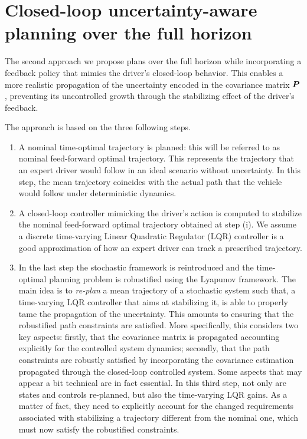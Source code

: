 \section{Closed-loop uncertainty-aware planning over the full horizon}
\label{sec:closed_loop_planning}

The second approach we propose plans over the full horizon while incorporating a feedback policy that mimics the driver's closed-loop behavior. This enables a more realistic propagation of the uncertainty encoded in the covariance matrix $\boldsymbol{P}$, preventing its uncontrolled growth through the stabilizing effect of the driver's feedback.

The approach is based on the three following steps. 
\begin{enumerate}[label=\roman*)]
\item A nominal time-optimal trajectory is planned: this will be referred to as nominal feed-forward optimal trajectory. This represents the trajectory that an expert driver would follow in an ideal scenario without uncertainty. In this step, the mean trajectory coincides with the actual path that the vehicle would follow under deterministic dynamics.

\item A closed-loop controller mimicking the driver's action is computed to stabilize the nominal feed-forward optimal trajectory obtained at step (i). We assume a discrete time-varying Linear Quadratic Regulator (LQR) controller is a good approximation of how an expert driver can track a prescribed trajectory.

\item In the last step the stochastic framework is reintroduced and the time-optimal planning problem is robustified using the Lyapunov framework. The main idea is to \emph{re-plan} a mean trajectory of a stochastic system such that, a time-varying LQR controller that aims at stabilizing it, is able to properly tame the propagation of the uncertainty. This amounts to ensuring that the robustified path constraints are satisfied. More specifically, this considers two key aspects: firstly, that the covariance matrix is propagated accounting explicitly for the controlled system dynamics; secondly, that the path constraints are robustly satisfied by incorporating the covariance estimation propagated through the closed-loop controlled system. Some aspects that may appear a bit technical are in fact essential. In this third step, not only are states and controls re-planned, but also the time-varying LQR gains. As a matter of fact, they need to explicitly account for the changed requirements associated with stabilizing a trajectory different from the nominal one, which must now satisfy the robustified constraints. 
\end{enumerate}

